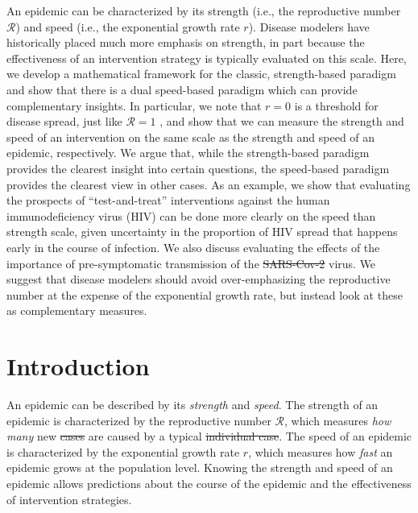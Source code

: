 \documentclass[12pt]{article}
\newcommand{\RR}{\ensuremath{{\mathcal R}}}
\providecommand{\DIFaddtex}[1]{{\protect\color{blue}\uwave{#1}}} %
\providecommand{\DIFdeltex}[1]{{\protect\color{red}\sout{#1}}}                      %
\providecommand{\DIFaddbegin}{} %
\providecommand{\DIFaddend}{} %
\providecommand{\DIFdelbegin}{} %
\providecommand{\DIFdelend}{} %
\providecommand{\DIFadd}[1]{\texorpdfstring{\DIFaddtex{#1}}{#1}} %
\providecommand{\DIFdel}[1]{\texorpdfstring{\DIFdeltex{#1}}{}} %
\newcommand{\DIFscaledelfig}{0.5}
\newlength{\DIFdelgraphicswidth} %
\newlength{\DIFdelgraphicsheight} %
\newcommand{\DIFaddincludegraphics}[2][]{{\color{blue}\fbox{\DIFOincludegraphics[#1]{#2}}}} %
\newcommand{\DIFdelincludegraphics}[2][]{%
\sbox{\DIFdelgraphicsbox}{\DIFOincludegraphics[#1]{#2}}%
\settoboxwidth{\DIFdelgraphicswidth}{\DIFdelgraphicsbox} %
\settoboxtotalheight{\DIFdelgraphicsheight}{\DIFdelgraphicsbox} %
\scalebox{\DIFscaledelfig}{%
\parbox[b]{\DIFdelgraphicswidth}{\usebox{\DIFdelgraphicsbox}\\[-\baselineskip] \rule{\DIFdelgraphicswidth}{0em}}\llap{\resizebox{\DIFdelgraphicswidth}{\DIFdelgraphicsheight}{%
\setlength{\unitlength}{\DIFdelgraphicswidth}%
\begin{picture}(1,1)%
\thicklines\linethickness{2pt} %
{\color[rgb]{1,0,0}\put(0,0){\framebox(1,1){}}}%
{\color[rgb]{1,0,0}\put(0,0){\line( 1,1){1}}}%
{\color[rgb]{1,0,0}\put(0,1){\line(1,-1){1}}}%
\end{picture}%
}\hspace*{3pt}}} %
} %
\DeclareRobustCommand{\DIFaddbegin}{\DIFOaddbegin \let\includegraphics\DIFaddincludegraphics} %
\DeclareRobustCommand{\DIFaddend}{\DIFOaddend \let\includegraphics\DIFOincludegraphics} %
\DeclareRobustCommand{\DIFdelbegin}{\DIFOdelbegin \let\includegraphics\DIFdelincludegraphics} %
\DeclareRobustCommand{\DIFdelend}{\DIFOaddend \let\includegraphics\DIFOincludegraphics} %
\begin{document}
An epidemic can be characterized by its strength (i.e., the reproductive number \RR) and speed (i.e., the exponential growth rate $r$).
Disease modelers have historically placed much more emphasis on strength, in part because the effectiveness of an intervention strategy is typically evaluated on this scale.  
Here, we develop a mathematical framework for the classic, strength-based paradigm and show that there is a dual speed-based paradigm which can provide complementary insights.
In particular, we note that $r=0$ is a threshold for disease spread, just like $\RR=1$ \cite{dhmKermack}, and show that we can measure the strength and speed of an intervention on the same scale as the strength and speed of an epidemic, respectively.
We argue that, while the strength-based paradigm provides the clearest insight into certain questions, the speed-based paradigm provides the clearest view in other cases.
As an example, we show that evaluating the prospects of ``test-and-treat'' interventions against the human immunodeficiency virus (HIV) can be done more clearly on the speed than strength scale, given uncertainty in the proportion of HIV spread that happens early in the course of infection. 
We also discuss evaluating the effects of the importance of pre-symptomatic transmission of the \DIFdelbegin \DIFdel{SARS-Cov-2 }\DIFdelend \DIFaddbegin \DIFadd{SARS-CoV-2 }\DIFaddend virus.
We suggest that disease modelers should avoid over-emphasizing the reproductive number at the expense of the exponential growth rate, but instead look at these as complementary measures.

\pagebreak

\section{Introduction}

An epidemic can be described by its \emph{strength} and \emph{speed}.
The strength of an epidemic is characterized by the reproductive number \RR, which measures \emph{how many} new \DIFdelbegin \DIFdel{cases }\DIFdelend \DIFaddbegin \DIFadd{infections }\DIFaddend are caused by a typical \DIFdelbegin \DIFdel{individual case}\DIFdelend \DIFaddbegin \DIFadd{infected individual}\DIFaddend .
The speed of an epidemic is characterized by the exponential growth rate $r$, which measures how \emph{fast} an epidemic grows at the population level.
Knowing the strength and speed of an epidemic allows predictions about the course of the epidemic and the effectiveness of intervention strategies.
\end{document}
